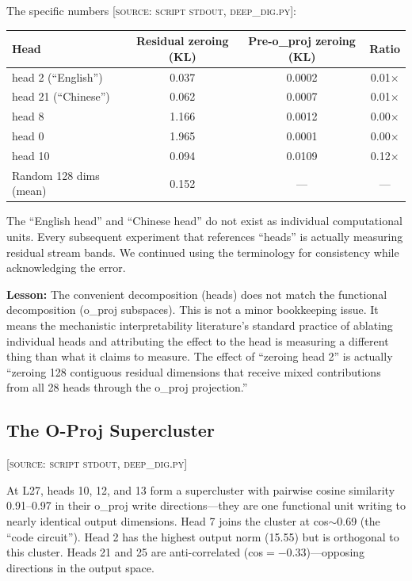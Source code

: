 \documentclass[11pt,a4paper]{article}
\begin{document}
The specific numbers \textsc{[source: script stdout, deep\_dig.py]}:

\begin{center}
\begin{tabular}{lccc}
\toprule
\textbf{Head} & \textbf{Residual zeroing (KL)} & \textbf{Pre-o\_proj zeroing (KL)} & \textbf{Ratio} \\
\midrule
head 2 (``English'') & 0.037 & 0.0002 & 0.01$\times$ \\
head 21 (``Chinese'') & 0.062 & 0.0007 & 0.01$\times$ \\
head 8 & 1.166 & 0.0012 & 0.00$\times$ \\
head 0 & 1.965 & 0.0001 & 0.00$\times$ \\
head 10 & 0.094 & 0.0109 & 0.12$\times$ \\
Random 128 dims (mean) & 0.152 & --- & --- \\
\bottomrule
\end{tabular}
\end{center}

The ``English head'' and ``Chinese head'' do not exist as individual computational units. Every subsequent experiment that references ``heads'' is actually measuring residual stream bands. We continued using the terminology for consistency while acknowledging the error.

\textbf{Lesson:} The convenient decomposition (heads) does not match the functional decomposition (o\_proj subspaces). This is not a minor bookkeeping issue. It means the mechanistic interpretability literature's standard practice of ablating individual heads and attributing the effect to the head is measuring a different thing than what it claims to measure. The effect of ``zeroing head 2'' is actually ``zeroing 128 contiguous residual dimensions that receive mixed contributions from all 28 heads through the o\_proj projection.''

\subsection{The O-Proj Supercluster}
\textsc{[source: script stdout, deep\_dig.py]}

At L27, heads 10, 12, and 13 form a supercluster with pairwise cosine similarity 0.91--0.97 in their o\_proj write directions---they are one functional unit writing to nearly identical output dimensions. Head 7 joins the cluster at cos$\sim$0.69 (the ``code circuit''). Head 2 has the highest output norm (15.55) but is orthogonal to this cluster. Heads 21 and 25 are anti-correlated (cos$=-0.33$)---opposing directions in the output space.
\end{document}
